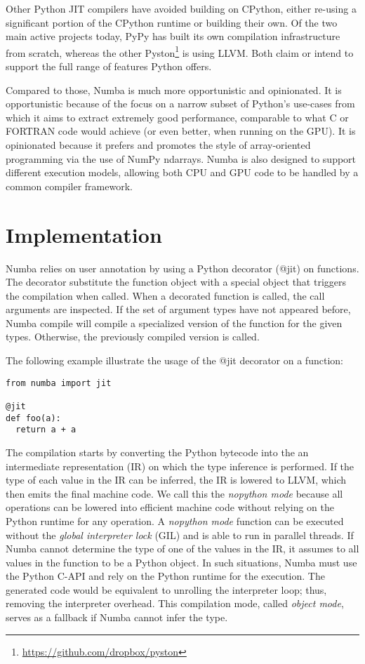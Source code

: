 \documentclass{acm_proc_article-sp}
\begin{document}
Other Python JIT compilers have avoided building on CPython, either
re-using a significant portion of the CPython runtime or building
their own.  Of the two main active projects today, PyPy
\cite{pypy:pypy} has built its own compilation infrastructure from
scratch, whereas the other
Pyston\footnote{\url{https://github.com/dropbox/pyston}} is using
LLVM.  Both claim or intend to support the full range of features
Python offers.

Compared to those, Numba is much more opportunistic and opinionated.
It is opportunistic because of the focus on a narrow subset of Python's use-cases
from which it aims to extract extremely good performance, comparable to what C
or FORTRAN code would achieve (or even better, when running on the GPU).
It is opinionated because it prefers and promotes the style of array-oriented
programming via the use of NumPy ndarrays.
Numba is also designed to support different execution models, allowing both
CPU and GPU code to be handled by a common compiler framework.


\section{Implementation}

Numba relies on user annotation by using a Python decorator (@jit) on functions.
The decorator substitute the function object with a special object that triggers
the compilation when called. When a decorated function is called,
the call arguments are inspected. If the set of argument types have not appeared
before, Numba compile will compile a specialized version of the function for the
given types. Otherwise, the previously compiled version is called.

The following example illustrate the usage of the @jit decorator on a function:


\begin{lstlisting}
from numba import jit

@jit
def foo(a):
  return a + a
\end{lstlisting}

The compilation starts by converting the Python bytecode into the an
intermediate representation (IR) on which the type inference is
performed. If the type of each value in the IR can be inferred, the IR
is lowered to LLVM, which then emits the final machine code.  We call
this the \textit{nopython mode} because all operations can be lowered
into efficient machine code without relying on the Python runtime for
any operation.  A \textit{nopython mode} function can be executed
without the \textit{global interpreter lock} (GIL) and is able to run
in parallel threads.  If Numba cannot determine the type of one of the
values in the IR, it assumes to all values in the function to be a
Python object. In such situations, Numba must use the Python C-API and
rely on the Python runtime for the execution. The generated code would
be equivalent to unrolling the interpreter loop; thus, removing the
interpreter overhead.  This compilation mode, called \textit{object
  mode}, serves as a fallback if Numba cannot infer the type.
\end{document}
